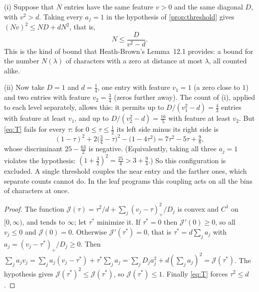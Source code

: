 \documentclass[11pt]{amsart}
\numberwithin{equation}{section}
\theoremstyle{plain}
\theoremstyle{definition}
\theoremstyle{remark}
\newcommand{\1}{\mathbf{1}}
\begin{document}
\begin{example}\label{ex:twolevels}
(i) Suppose that $N$ entries have the same feature $v>0$ and the same diagonal $D$, with $v^2>d$.
Taking every $a_j=1$ in the hypothesis of \cref{prop:threshold} gives $(Nv)^2\le ND+dN^2$, that is,
\[
  N\le\frac{D}{v^2-d}.
\]
This is the kind of bound that Heath-Brown's Lemma~12.1 provides: a bound for the number
$N(\lambda)$ of characters with a zero at distance at most $\lambda$, all counted alike.

(ii) Now take $D=1$ and $d=\frac14$, one entry with feature $v_1=1$ (a zero close to $1$) and two
entries with feature $v_2=\frac34$ (zeros further away). The count of (i), applied to each level
separately, allows this: it permits up to $D/(v_1^2-d)=\frac43$ entries with feature at least $v_1$,
and up to $D/(v_2^2-d)=\frac{16}5$ with feature at least $v_2$. But \eqref{eq:T} fails for every $\tau$:
for $0\le\tau\le\frac12$ its left side minus its right side is
\[
  (1-\tau)^2+2\bigl(\tfrac34-\tau\bigr)^2-\bigl(1-4\tau^2\bigr)=7\tau^2-5\tau+\tfrac98,
\]
whose discriminant $25-\frac{63}2$ is negative. (Equivalently, taking all three $a_j=1$ violates the
hypothesis: $(1+\frac32)^2=\frac{25}4>3+\frac94$.) So this configuration is excluded. A single
threshold couples the near entry and the farther ones, which separate counts cannot do. In
the leaf programs this coupling acts on all the bins of characters at once.
\end{example}

\begin{proof}
The function $\mathcal J(\tau)=\tau^2/d+\sum_j(v_j-\tau)_+^2/D_j$ is convex and $C^1$ on $[0,\infty)$, and
tends to $\infty$; let $\tau^*$ minimize it. If $\tau^*=0$ then $\mathcal J'(0)\ge0$, so all $v_j\le0$ and
$\mathcal J(0)=0$. Otherwise $\mathcal J'(\tau^*)=0$, that is $\tau^*=d\sum_ja_j$ with $a_j=(v_j-\tau^*)_+/D_j\ge0$.
Then $\sum_ja_jv_j=\sum_ja_j(v_j-\tau^*)+\tau^*\sum_ja_j=\sum_jD_ja_j^2+d(\sum_ja_j)^2=\mathcal J(\tau^*)$.
The hypothesis gives $\mathcal J(\tau^*)^2\le\mathcal J(\tau^*)$, so $\mathcal J(\tau^*)\le1$. Finally \eqref{eq:T} forces
$\tau^2\le d$.
\end{proof}
\end{document}

